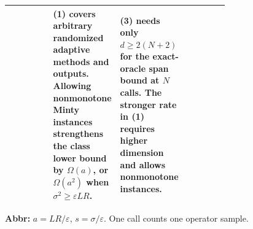 \begin{table}[tp]
\begin{threeparttable}
\begin{tabularx}{\linewidth}{@{}>{\raggedright\arraybackslash}p{0.20\linewidth}>{\raggedright\arraybackslash}p{0.20\linewidth}>{\raggedright\arraybackslash}p{0.31\linewidth}>{\raggedright\arraybackslash}X@{}}
& \textbf{(1)} covers arbitrary randomized adaptive methods and outputs. Allowing nonmonotone Minty instances strengthens the class lower bound by $\Omega(a)$, or $\Omega(a^2)$ when $\sigma^2\ge\varepsilon LR$.
& \textbf{(3)} needs only $d\ge2(N+2)$ for the exact-oracle span bound at $N$ calls. The stronger rate in \textbf{(1)} requires higher dimension and allows nonmonotone instances. \\
\bottomrule
\end{tabularx}
\begin{tablenotes}[flushleft]\footnotesize
\item[] \textbf{Abbr:} $a=LR/\varepsilon$, $s=\sigma/\varepsilon$. One call counts one operator sample.
\end{tablenotes}
\end{threeparttable}
\end{table}

